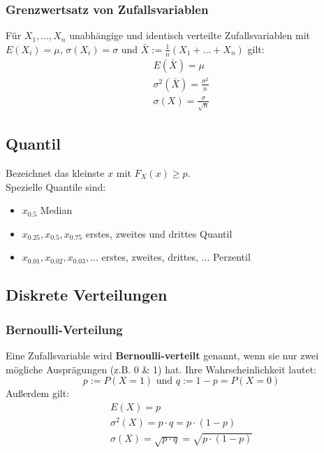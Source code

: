 \documentclass[12pt]{article}
\begin{document}
\subsubsection{Grenzwertsatz von Zufallsvariablen}
Für $X_1,...,X_n$ unabhängige und identisch verteilte Zufallsvariablen mit $E(X_i)=\mu$, $\sigma(X_i)=\sigma$ und $\bar{X}:=\frac{1}{n}(X_1+...+X_n)$ gilt:
\begin{gather*}
	E(\bar{X})=\mu \\
	\sigma^2(\bar{X})=\frac{\sigma^2}{n}\\
	\sigma(X)=\frac{\sigma}{\sqrt{n}}
\end{gather*}
\subsection{Quantil}
Bezeichnet das kleinste $x$ mit $F_X(x)\geq p$. \\
Spezielle Quantile sind:
\begin{itemize}
	\item $x_{0.5}$ Median
	\item $x_{0.25}, x_{0.5}, x_{0.75}$ erstes, zweites und drittes Quantil
	\item $x_{0.01}, x_{0.02}, x_{0.03}, ...$ erstes, zweites, drittes, ... Perzentil
\end{itemize}
\subsection{Diskrete Verteilungen}
\subsubsection{Bernoulli-Verteilung}
Eine Zufallsvariable wird \textbf{Bernoulli-verteilt} genannt, wenn sie nur zwei mögliche Ausprägungen (z.B. 0 \& 1) hat.  Ihre Wahrscheinlichkeit lautet:
\begin{equation*}
	p:=P(X=1) \text{ und } q:=1-p=P(X=0)
\end{equation*}
Außerdem gilt:
\begin{gather*}
	E(X)=p\\
	\sigma^2(X)=p\cdot q=p\cdot (1-p)\\
	\sigma(X)=\sqrt{p\cdot q}=\sqrt{p\cdot (1-p)}
\end{gather*}
\end{document}
